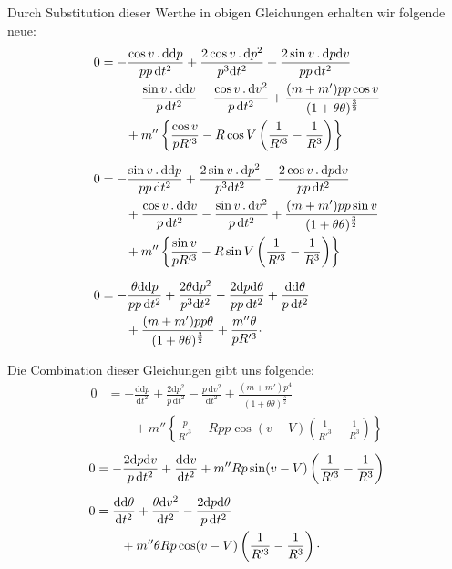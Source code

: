 \par\noindent\hspace*{\parindent}Durch Substitution dieser Werthe in obigen Gleichungen erhalten wir
folgende neue:
\[
\begin{aligned}
0&=-\frac{\cos v\, .\,\mathrm{dd}p}{pp\,\mathrm{d}t^2}
  +\frac{2\cos v\, .\,\mathrm{d}p^2}{p^3\mathrm{d}t^2}
  +\frac{2\sin v\, .\,\mathrm{d}p\mathrm{d}v}{pp\,\mathrm{d}t^2}\\
 &\qquad-\frac{\sin v\, .\,\mathrm{dd}v}{p\,\mathrm{d}t^2}
  -\frac{\cos v\, .\,\mathrm{d}v^2}{p\,\mathrm{d}t^2}
  +\frac{(m+m')pp\cos v}{(1+\theta\theta)^{\frac{3}{2}}}\\
 &\qquad+m''\left\{\frac{\cos v}{pR'^3}
  -R\cos V\left(\frac{1}{R'^3}-\frac{1}{R^3}\right)\right\}\\[6pt]
0&=-\frac{\sin v\, .\,\mathrm{dd}p}{pp\,\mathrm{d}t^2}
  +\frac{2\sin v\, .\,\mathrm{d}p^2}{p^3\mathrm{d}t^2}
  -\frac{2\cos v\, .\,\mathrm{d}p\mathrm{d}v}{pp\,\mathrm{d}t^2}\\
 &\qquad+\frac{\cos v\, .\,\mathrm{dd}v}{p\,\mathrm{d}t^2}
  -\frac{\sin v\, .\,\mathrm{d}v^2}{p\,\mathrm{d}t^2}
  +\frac{(m+m')pp\sin v}{(1+\theta\theta)^{\frac{3}{2}}}\\
 &\qquad+m''\left\{\frac{\sin v}{pR'^3}
  -R\sin V\left(\frac{1}{R'^3}-\frac{1}{R^3}\right)\right\}\\[6pt]
0&=-\frac{\theta\mathrm{dd}p}{pp\,\mathrm{d}t^2}
  +\frac{2\theta\mathrm{d}p^2}{p^3\mathrm{d}t^2}
  -\frac{2\mathrm{d}p\mathrm{d}\theta}{pp\,\mathrm{d}t^2}
  +\frac{\mathrm{dd}\theta}{p\,\mathrm{d}t^2}\\
 &\qquad+\frac{(m+m')pp\theta}{(1+\theta\theta)^{\frac{3}{2}}}
  +\frac{m''\theta}{pR'^3}\mathpunct{\raisebox{.4ex}{.}}
\end{aligned}
\]

\par\noindent\hspace*{\parindent}Die Combination dieser Gleichungen gibt uns folgende:
\[
\begin{aligned}
0&=-\frac{\mathrm{dd}p}{\mathrm{d}t^2}
  +\frac{2\mathrm{d}p^2}{p\,\mathrm{d}t^2}
  -\frac{p\,\mathrm{d}v^2}{\mathrm{d}t^2}
  +\frac{(m+m')p^4}{(1+\theta\theta)^{\frac{3}{2}}}\\
 &\qquad+m''\left\{\frac{p}{R'^3}
  -Rpp\cos(v-V)\left(\frac{1}{R'^3}-\frac{1}{R^3}\right)\right\}
\end{aligned}
\]
\[
\begin{aligned}
0&=-\frac{2\mathrm{d}p\mathrm{d}v}{p\,\mathrm{d}t^2}
  +\frac{\mathrm{dd}v}{\mathrm{d}t^2}
  +m''Rp\sin(v-V)\left(\frac{1}{R'^3}-\frac{1}{R^3}\right)\\[5pt]
0&=\frac{\mathrm{dd}\theta}{\mathrm{d}t^2}
  +\frac{\theta\mathrm{d}v^2}{\mathrm{d}t^2}
  -\frac{2\mathrm{d}p\mathrm{d}\theta}{p\,\mathrm{d}t^2}\\
 &\qquad+m''\theta Rp\cos(v-V)\left(\frac{1}{R'^3}-\frac{1}{R^3}\right)
  \mathpunct{\raisebox{.4ex}{.}}
\end{aligned}
\]

